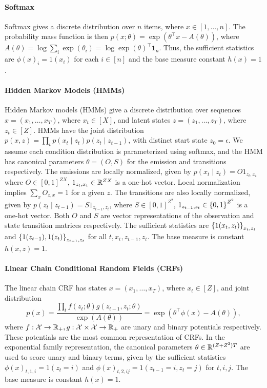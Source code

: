 \documentclass[11pt]{article}
\begin{document}
\paragraph{Softmax}
Softmax gives a discrete distribution over $n$ items, where $x\in[1,\ldots,n]$.
The probability mass function is then $p(x;\theta) = \exp(\theta^\top x - A(\theta))$,
where $A(\theta) = \log \sum_i \exp(\theta_i) = \log \exp(\theta)^\top\mathbf{1}_n$.
Thus, the sufficient statistics are $\phi(x)_i = 1(x_i)$ for each $i\in[n]$ and
the base measure constant $h(x)=1$.

\paragraph{Hidden Markov Models (HMMs)}
Hidden Markov models (HMMs) give a discrete distribution over sequences $x = (x_1,\ldots,x_T)$,
where $x_t\in[X]$,
and latent states $z = (z_1,\ldots,z_T)$, where $z_t\in[Z]$.
HMMs have the joint distribution
$p(x,z) = \prod_t p(x_t\mid z_t)p(z_t\mid z_{t-1})$,
with distinct start state $z_0=\epsilon$.
We assume each condition distribution is parameterized using softmax,
and the HMM has canonical parameters $\theta = (O,S)$ for the emission and transitions respectively.
The emissions are locally normalized, given by $p(x_t\mid z_t) = O 1_{z_t,x_t}$
where $O\in[0,1]^{ZX}$, $1_{z_t,x_t}\in\mathbb{R}^{ZX}$ is a one-hot vector.
Local normalization implies $\sum_x O_{z,x}=1$ for a given $z$.
The transitions are also locally normalized, given by $p(z_t\mid z_{t-1}) = S 1_{z_{t-1},z_t}$,
where $S\in[0,1]^{Z^2}$, $1_{z_{t-1},z_t}\in\left\{0,1\right\}^{Z^2}$ is a one-hot vector.
Both $O$ and $S$ are vector representations of the observation and state transition
matrices respectively.
The sufficient statistics are $\left\{1(x_t,z_t)\right\}_{x_t,z_t}$
and $\left\{1(z_{t-1}),1(z_t)\right\}_{z_{t-1},z_t}$ for all $t,x_t,z_{t-1},z_t$.
The base measure is constant $h(x,z) = 1$.

\paragraph{Linear Chain Conditional Random Fields (CRFs)}
The linear chain CRF has states $x = (x_1,\ldots,x_T)$, where $x_t\in[Z]$,
and joint distribution
$$p(x) = \frac{\prod_t f(z_t; \theta)g(z_{t-1},z_t; \theta)}{\exp(A(\theta))}
= \exp(\theta^\top \phi(x) - A(\theta)),$$
where $f:\mathcal{X}\to\mathbb{R}_+,g:\mathcal{X}\times\mathcal{X}\to\mathbb{R}_+$ are unary and binary potentials respectively.
These potentials are the most common representation of CRFs.
In the exponential family representation,
the canonical parameters $\theta\in\mathbb{R}^{(Z + Z^2)T}$ are used to score unary and binary terms,
given by the sufficient statistics $\phi(x)_{t,1,i} = 1(z_t = i)$ and
$\phi(x)_{t,2,ij} = 1(z_{t-1} = i, z_t = j)$ for $t,i,j$.
The base measure is constant $h(x) = 1$.
\end{document}
